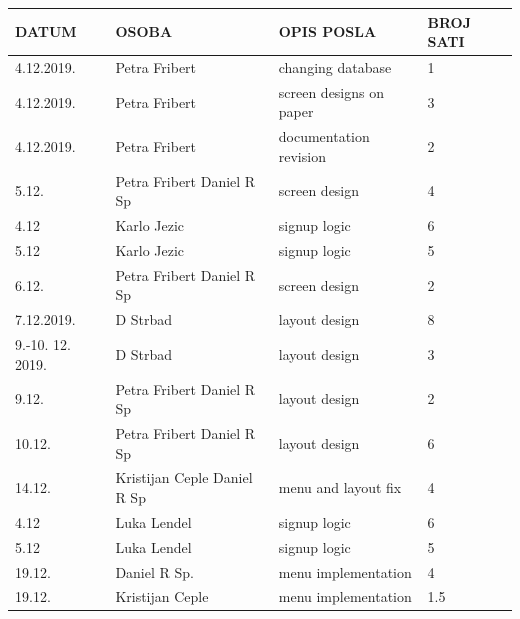 		\begin{longtable}{llll}
			DATUM            & OSOBA                         & OPIS POSLA                      & BROJ SATI \\
			\endhead
			4.12.2019.       & Petra Fribert                 & changing database               & 1         \\
			4.12.2019.       & Petra Fribert                 & screen designs on paper         & 3         \\
			4.12.2019.       & Petra Fribert                 & documentation revision          & 2         \\
			5.12.            & Petra Fribert Daniel R Sp     & screen design                   & 4         \\
			4.12             & Karlo Jezic                   & signup logic                    & 6         \\
			5.12             & Karlo Jezic                   & signup logic                    & 5         \\
			6.12.            & Petra Fribert Daniel R Sp     & screen design                   & 2         \\
			7.12.2019.       & D Strbad                      & layout design                   & 8         \\
			9.-10. 12. 2019. & D Strbad                      & layout design                   & 3         \\
			9.12.            & Petra Fribert Daniel R Sp     & layout design                   & 2         \\
			10.12.           & Petra Fribert Daniel R Sp     & layout design                   & 6         \\
			14.12.           & Kristijan Ceple Daniel R Sp   & menu and layout fix             & 4         \\
			4.12             & Luka Lendel                   & signup logic                    & 6         \\
			5.12             & Luka Lendel                   & signup logic                    & 5         \\
			19.12.           & Daniel R Sp.                  & menu implementation             & 4         \\
			19.12.           & Kristijan Ceple               & menu implementation             & 1.5       \\

\end{longtable}

